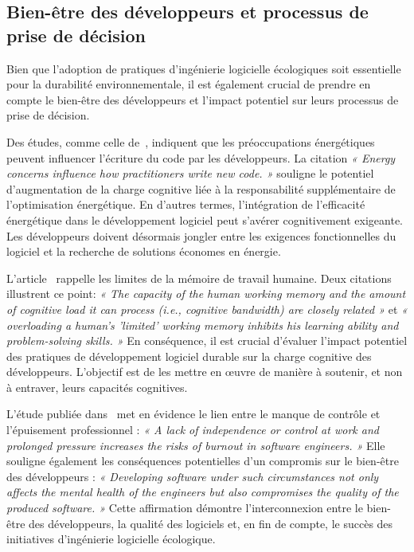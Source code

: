 \subsection{Bien-être des développeurs et processus de prise de décision}

Bien que l'adoption de pratiques d'ingénierie logicielle écologiques soit essentielle pour la durabilité environnementale, il est également crucial de prendre en compte le bien-être des développeurs et l'impact potentiel sur leurs processus de prise de décision.


Des études, comme celle de~\cite{EmpiricalStudy}, indiquent que les préoccupations énergétiques peuvent influencer l'écriture du code par les développeurs. La citation \emph{« Energy concerns influence how practitioners write new code. »} souligne le potentiel d'augmentation de la charge cognitive liée à la responsabilité supplémentaire de l'optimisation énergétique. En d'autres termes, l'intégration de l'efficacité énergétique dans le développement logiciel peut s'avérer cognitivement exigeante. Les développeurs doivent désormais jongler entre les exigences fonctionnelles du logiciel et la recherche de solutions économes en énergie.


L'article~\cite{SustainableEngNeglectedPerspective} rappelle les limites de la mémoire de travail humaine. Deux citations illustrent ce point: \emph{« The capacity of the human working memory and the amount of cognitive load it can process (i.e., cognitive bandwidth) are closely related »} et \emph{« overloading a human’s 'limited' working memory inhibits his learning ability and problem-solving skills. »} En conséquence, il est crucial d'évaluer l'impact potentiel des pratiques de développement logiciel durable sur la charge cognitive des développeurs. L'objectif est de les mettre en œuvre de manière à soutenir, et non à entraver, leurs capacités cognitives.


L'étude publiée dans~\cite{SustainableEngNeglectedPerspective} met en évidence le lien entre le manque de contrôle et l'épuisement professionnel : \emph{« A lack of independence or control at work and prolonged pressure increases the risks of burnout in software engineers. »} Elle souligne également les conséquences potentielles d'un compromis sur le bien-être des développeurs : \emph{« Developing software under such circumstances not only affects the mental health of the engineers but also compromises the quality of the produced software. »} Cette affirmation démontre l'interconnexion entre le bien-être des développeurs, la qualité des logiciels et, en fin de compte, le succès des initiatives d'ingénierie logicielle écologique.


